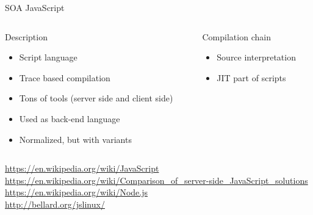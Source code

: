 %
\begin{Frame}{SOA JavaScript}
  \begin{columns}[t]
    \begin{column}{\BW} %
      \begin{block}{Description}
        \begin{itemize}
        \item Script language
        \item Trace based compilation\TBD
        \item Tons of tools (server side and client side)\TBD
        \item Used as back-end language
        \item Normalized, but with variants
        \end{itemize}
      \end{block} 
    \end{column}
    
    \begin{column}{\BW} %
      \begin{block}{Compilation chain}
        \begin{itemize}
        \item Source interpretation
        \item JIT part of scripts \TBD
        \end{itemize}
      \end{block}   
    \end{column}
  \end{columns}
\url{https://en.wikipedia.org/wiki/JavaScript}\\
\url{https://en.wikipedia.org/wiki/Comparison_of_server-side_JavaScript_solutions}\\
\url{https://en.wikipedia.org/wiki/Node.js} \\
\url{http://bellard.org/jslinux/}

\end{Frame}


